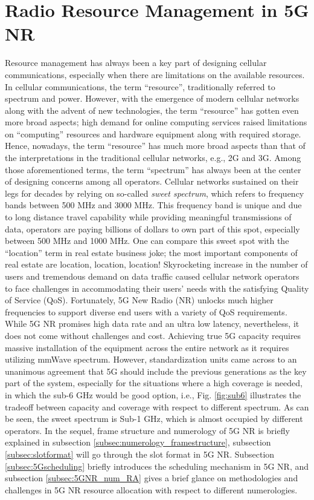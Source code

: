 \documentclass[journal,draftclsnofoot,onecolumn,12pt]{IEEEtran}
\theoremstyle{definition}
\begin{document}
\section{Radio Resource Management in 5G NR}
\label{sec:mansintro}
Resource management has always been a key part of designing cellular communications, especially when there are limitations on the available resources. In cellular communications, the term ``resource'', traditionally referred to spectrum and power. However, with the emergence of modern cellular networks along with the advent of new technologies, the term ``resource'' has gotten even more broad aspects; high demand for online computing services raised limitations on ``computing'' resources and hardware equipment along with required storage. Hence, nowadays, the term ``resource'' has much more broad aspects than that of the interpretations in the traditional cellular networks, e.g., 2G and 3G. Among those aforementioned terms, the term ``spectrum'' has always been at the center of designing concerns among all operators. Cellular networks sustained on their legs for decades by relying on so-called \textit{sweet spectrum}, which refers to frequency bands between 500 MHz and 3000 MHz. This frequency band is unique and due to long distance travel capability while providing meaningful transmissions of data, operators are paying billions of dollars to own part of this spot, especially between 500 MHz and 1000 MHz. One can compare this sweet spot with the ``location'' term in real estate business joke; the most important components of real estate are location, location, location! Skyrocketing increase in the number of users and tremendous demand on data traffic caused cellular network operators to face challenges in accommodating their users' needs with the satisfying Quality of Service (QoS). Fortunately, 5G New Radio (NR) unlocks much higher frequencies to support diverse end users with a variety of QoS requirements. While 5G NR promises high data rate and an ultra low latency, nevertheless, it does not come without challenges and cost. Achieving true 5G capacity requires massive installation of the equipment across the entire network as it requires utilizing mmWave spectrum. However, standardization units came across to an unanimous agreement that 5G should include the previous generations as the key part of the system, especially for the situations where a high coverage is needed, in which the sub-6 GHz would be good option, i.e., Fig. \ref{fig:sub6} illustrates the tradeoff between capacity and coverage with respect to different spectrum. As can be seen, the sweet spectrum is Sub-1 GHz, which is almost occupied by different operators. In the sequel, frame structure and numerology of 5G NR is briefly explained in subsection \ref{subsec:numerology_framestructure}, subsection \ref{subsec:slotformat} will go through the slot format in 5G NR. Subsection \ref{subsec:5Gscheduling} briefly introduces the scheduling mechanism in 5G NR, and subsection \ref{subsec:5GNR_num_RA} gives a brief glance on methodologies and challenges in 5G NR resource allocation with respect to different numerologies. 
\end{document}
